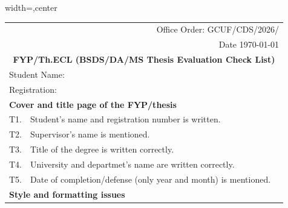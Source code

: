\begin{table}[!ht]
\footnotesize
\begin{adjustbox}{width=\linewidth,center}
\begin{tabular}{p{0.6cm}p{9cm}p{0.6cm}}
\multicolumn{3}{r}{Office Order: GCUF/CDS/2026/} \\
\multicolumn{3}{r}{Date  \today}                                          \\
\multicolumn{3}{c}{\textbf{FYP/Th.ECL (BSDS/DA/MS Thesis   Evaluation Check List)}}   \\\midrule
\multicolumn{3}{|l|}{Student  Name:}                                                                                                                                                     \\ \midrule
\multicolumn{3}{|l|}{Registration:}                                                                                                                                                      \\ \midrule
\multicolumn{3}{|l|}{\textbf{Cover and title   page of the FYP/thesis}}                                                                                                                      \\ \midrule
\multicolumn{1}{|l|}{T1.} & \multicolumn{1}{l|}{Student's name and registration   number is written.}                                                            & \multicolumn{1}{l|}{} \\ \midrule
\multicolumn{1}{|l|}{T2.} & \multicolumn{1}{l|}{Supervisor's name is   mentioned.}                                                                               & \multicolumn{1}{l|}{} \\ \midrule
\multicolumn{1}{|l|}{T3.} & \multicolumn{1}{l|}{Title of the degree   is written correctly.}                                                                     & \multicolumn{1}{l|}{} \\ \midrule
\multicolumn{1}{|l|}{T4.} & \multicolumn{1}{l|}{University and   departmet's name are written correctly.}                                                           & \multicolumn{1}{l|}{} \\ \midrule
\multicolumn{1}{|l|}{T5.} & \multicolumn{1}{l|}{Date of   completion/defense (only year and month) is mentioned.}                                                & \multicolumn{1}{l|}{} \\ \midrule
\multicolumn{3}{|l|}{\textbf{Style and formatting issues}}                                                                                                                               \\ \midrule

\end{tabular}
\end{adjustbox}
\end{table}
